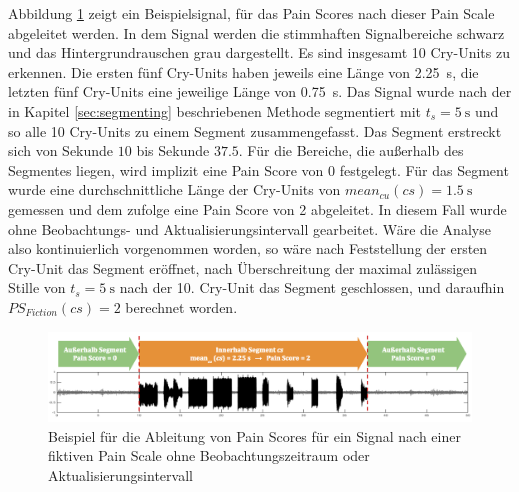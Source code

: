 Abbildung \ref{img:regression_score_example01} zeigt ein Beispielsignal, für das Pain Scores nach dieser Pain Scale abgeleitet werden. In dem Signal werden die stimmhaften Signalbereiche schwarz und das Hintergrundrauschen grau dargestellt. Es sind insgesamt 10 Cry-Units zu erkennen. Die ersten fünf Cry-Units haben jeweils eine Länge von \SI{2.25}{\second}, die letzten fünf Cry-Units eine jeweilige Länge von \SI{0.75}{\second}. Das Signal wurde nach der in Kapitel \ref{sec:segmenting} beschriebenen Methode segmentiert mit $t_s = \SI{5}{\second}$ und so alle 10 Cry-Units zu einem Segment zusammengefasst. Das Segment erstreckt sich von Sekunde $10$ bis Sekunde $37.5$. Für die Bereiche, die außerhalb des Segmentes liegen, wird implizit eine Pain Score von 0 festgelegt. Für das Segment wurde eine durchschnittliche Länge der Cry-Units von $mean_{cu}(cs) = \SI{1.5}{\second}$ gemessen und dem zufolge eine Pain Score von 2 abgeleitet. In diesem Fall wurde ohne Beobachtungs- und Aktualisierungsintervall gearbeitet. Wäre die Analyse also kontinuierlich vorgenommen worden, so wäre nach Feststellung der ersten Cry-Unit das Segment eröffnet, nach Überschreitung der maximal zulässigen Stille von $t_s = \SI{5}{\second}$ nach der 10. Cry-Unit das Segment geschlossen, und daraufhin $PS_{Fiction}(cs) = 2$ berechnet worden.

\begin{figure}[h]
	\centering
	\includegraphics[width=1\textwidth]{bilder/regression_score_example01.png}
	\caption{Beispiel für die Ableitung von Pain Scores für ein Signal nach einer fiktiven Pain Scale ohne Beobachtungszeitraum oder Aktualisierungsintervall}
	\label{img:regression_score_example01}
\end{figure}


